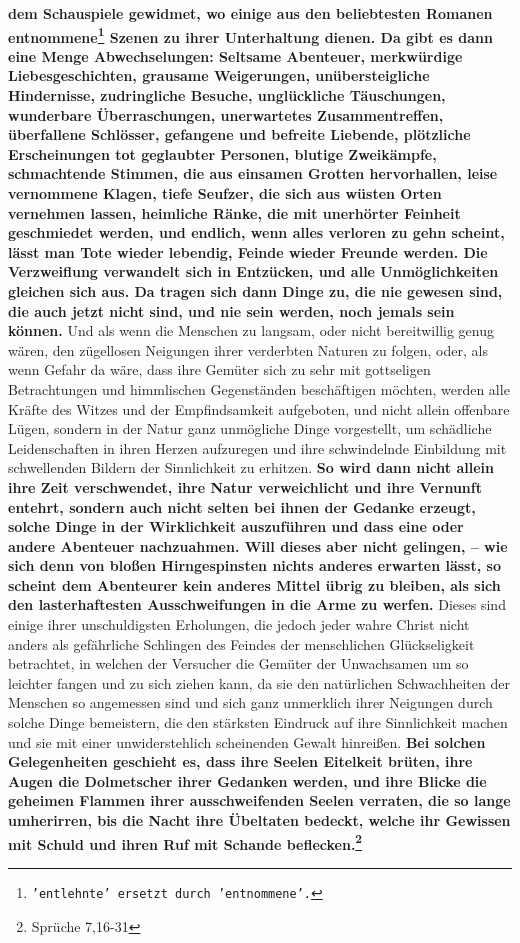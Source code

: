 \textbf{dem Schauspiele
gewidmet, wo einige aus den beliebtesten Romanen
entnommene\footnote{\texttt{'entlehnte' ersetzt durch 'entnommene'.}} Szenen zu
ihrer
Unterhaltung dienen. Da gibt es dann eine Menge Abwechselungen: Seltsame
Abenteuer, merkwürdige Liebesgeschichten, grausame Weigerungen,
unübersteigliche Hindernisse, zudringliche Besuche, unglückliche Täuschungen,
wunderbare Überraschungen, unerwartetes Zusammentreffen, überfallene Schlösser,
gefangene und befreite Liebende, plötzliche Erscheinungen tot geglaubter
Personen, blutige Zweikämpfe, schmachtende Stimmen, die aus einsamen Grotten
hervorhallen, leise vernommene Klagen, tiefe Seufzer, die sich aus wüsten
Orten vernehmen lassen, heimliche Ränke, die mit unerhörter Feinheit
geschmiedet werden, und endlich, wenn alles verloren zu gehn scheint, lässt man
Tote wieder lebendig, Feinde wieder Freunde werden. Die Verzweiflung verwandelt
sich in Entzücken, und alle Unmöglichkeiten gleichen sich aus. Da tragen sich
dann Dinge zu, die nie gewesen sind, die auch jetzt nicht sind, und nie sein
werden, noch jemals sein können.} Und als wenn die Menschen zu langsam, oder
nicht bereitwillig genug wären, den zügellosen Neigungen ihrer verderbten
Naturen zu folgen, oder, als wenn Gefahr da wäre, dass ihre Gemüter sich zu sehr
mit gottseligen Betrachtungen und himmlischen Gegenständen beschäftigen möchten,
werden alle Kräfte des Witzes und der Empfindsamkeit aufgeboten, und nicht
allein
offenbare Lügen, sondern in der Natur ganz unmögliche Dinge vorgestellt, um
schädliche Leidenschaften in ihren Herzen aufzuregen und ihre schwindelnde
Einbildung mit schwellenden Bildern der Sinnlichkeit zu erhitzen.
\label{ref:17_01_schauspiel_2}
\textbf{So wird dann
nicht allein ihre Zeit verschwendet, ihre Natur verweichlicht und ihre Vernunft
entehrt, sondern auch nicht selten bei ihnen der Gedanke erzeugt, solche Dinge
in der Wirklichkeit auszuführen und dass eine oder andere Abenteuer nachzuahmen.
Will dieses aber nicht gelingen, -- wie sich denn von bloßen Hirngespinsten
nichts anderes erwarten lässt, so scheint dem Abenteurer kein anderes Mittel
übrig
zu bleiben, als sich den lasterhaftesten Ausschweifungen in die Arme zu werfen.}
Dieses sind einige ihrer unschuldigsten Erholungen, die jedoch jeder wahre
Christ nicht anders als gefährliche Schlingen des Feindes der menschlichen
Glückseligkeit betrachtet, in welchen der Versucher die Gemüter der Unwachsamen
um so leichter fangen und zu sich ziehen kann, da sie den natürlichen
Schwachheiten der Menschen so angemessen sind und sich ganz unmerklich ihrer
Neigungen durch solche Dinge bemeistern, die den stärksten Eindruck auf ihre
Sinnlichkeit machen und sie mit einer unwiderstehlich scheinenden Gewalt
hinreißen. \textbf{Bei solchen Gelegenheiten geschieht es, dass ihre Seelen
Eitelkeit
brüten, ihre Augen die Dolmetscher ihrer Gedanken werden, und ihre Blicke die
geheimen Flammen ihrer ausschweifenden Seelen verraten, die so lange
umherirren, bis die Nacht ihre Übeltaten bedeckt, welche ihr Gewissen mit
Schuld und ihren Ruf mit Schande beflecken.\footnote{Sprüche 7,16-31}}

